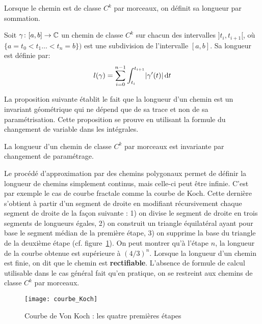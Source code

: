 Lorsque le chemin est de classe $C^k$ par morceaux, on définit sa longueur par sommation. 
\begin{fdefn}
Soit $\gamma \colon [a,b] \to \mathbb{C}$ un chemin de classe $C^k$ sur chacun des intervalles $]t_i,t_{i+1}[$, où $\{a=t_0 < t_1 \dots < t_n = b\})$ est une subdivision de l'intervalle $[a,b]$. Sa longueur est définie par:
\[
l(\gamma) = \sum_{i=0}^{n-1} \int_{t_i}^{t_{i+1}} \lvert \gamma^\prime(t) \rvert \mathop{}\mathopen{}\mathrm{d} t
\]
\end{fdefn}
La proposition suivante établit le fait que la longueur d'un chemin est un invariant géométrique qui ne dépend que de sa trace et non de sa paramétrisation. Cette proposition se prouve en utilisant la formule du changement de variable dans les intégrales. 
\begin{fprop}
La longueur d'un chemin de classe $C^k$ par morceaux est invariante par changement de paramétrage.
\end{fprop}
\begin{rem}
Le procédé d'approximation par des chemins polygonaux permet de définir la longueur de chemins simplement continus, mais celle-ci peut être infinie. C'est par exemple le cas de courbe fractale comme la courbe de Koch. Cette dernière s'obtient à partir d'un segment de droite en modifiant récursivement chaque segment de droite de la façon suivante : 
1) on divise le segment de droite en trois segments de longueurs égales, 2) on construit un triangle équilatéral ayant pour base le segment médian de la première étape, 3) on supprime la base du triangle de la deuxième étape (cf. figure~\ref{fig:Koch}). On peut montrer qu'à l'étape $n$, la longueur de la courbe obtenue est supérieure à $(4/3)^n$. Lorsque la longueur d'un chemin est finie, on dit que le chemin est \textbf{rectifiable}. L'absence de formule de calcul utilisable dans le cas général fait qu'en pratique, on se restreint aux chemins de classe $C^k$ par morceaux.
\begin{figure}[ht]
\texttt{[image: courbe\_Koch]}
\caption{Courbe de Von Koch : les quatre premières étapes}\label{fig:Koch}
\end{figure}
 
\end{rem}
